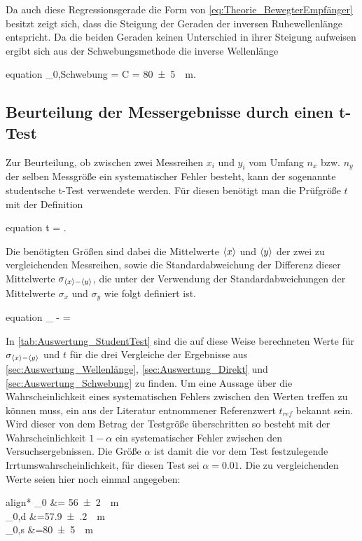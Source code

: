  	Da auch diese Regressionsgerade die Form von \cref{eq:Theorie_BewegterEmpfänger} besitzt zeigt
 	sich, dass die Steigung der Geraden der inversen Ruhewellenlänge entspricht. 
	Da die beiden Geraden keinen Unterschied in ihrer Steigung aufweisen ergibt sich aus der Schwebungsmethode
	die inverse Wellenlänge
	\begin{empheq}{equation}
		\label{eq:Auswertung_InverseWellenlänge_Schwebung}
		\lambda_{0,Schwebung} = C = \SI{80(5)}{\per\meter}.
	\end{empheq}

\subsection{Beurteilung der Messergebnisse durch einen t-Test}
	
	Zur Beurteilung, ob zwischen zwei Messreihen $x_{i}$ und $y_{i}$ vom Umfang $n_{x}$ bzw. $n_{y}$ 
	der selben Messgröße ein systematischer Fehler besteht, kann der sogenannte studentsche t-Test verwendete werden.
	Für diesen benötigt man die Prüfgröße $t$ mit der Definition
	\begin{empheq}{equation}
		\label{eq:Auswertung_tTest_t}
		t = .
	\end{empheq} 	
	Die benötigten Größen sind dabei die Mittelwerte $\langle x\rangle$ und $\langle y\rangle$ der zwei zu vergleichenden Messreihen,
	sowie die Standardabweichung der Differenz dieser Mittelwerte $\sigma_{\langle x\rangle - \langle y\rangle}$, die unter der 
	Verwendung der Standardabweichungen der Mittelwerte $\sigma_{x}$ und $\sigma_{y}$ wie folgt definiert ist.
	\begin{empheq}{equation}
		\label{eq:Auswertung_tTest_s}
		\sigma_{ - } = 
	\end{empheq} 
	In \cref{tab:Auswertung_StudentTest} sind die auf diese Weise berechneten Werte für  $\sigma_{\langle x\rangle - \langle y\rangle}$ und $t$ für die drei Vergleiche
	der Ergebnisse aus \cref{sec:Auswertung_Wellenlänge}, \ref{sec:Auswertung_Direkt} und \ref{sec:Auswertung_Schwebung} zu finden.
	Um eine Aussage über die Wahrscheinlichkeit eines systematischen Fehlers zwischen den Werten treffen zu können muss, ein aus der 
	Literatur \cite{Bortz10} entnommener Referenzwert $t_{ref}$ bekannt sein. Wird dieser von dem Betrag der Testgröße  
	überschritten so besteht mit der Wahrscheinlichkeit $1 - \alpha$ ein systematischer Fehler zwischen den Versuchsergebnissen.  
	Die Größe $\alpha$ ist damit die vor dem Test festzulegende Irrtumswahrscheinlichkeit, für diesen Test sei $\alpha = 0.01$. 	
	Die zu vergleichenden Werte seien hier noch einmal angegeben:
	\begin{empheq}{align*}
		\lambda_{0}   &= \SI{56(2)}{\per\meter} \\
		\lambda_{0,d} &=\SI{57.9(2)}{\per\meter}\\
		\lambda_{0,s} &=\SI{80(5)}{\per\meter}
	\end{empheq}
	
